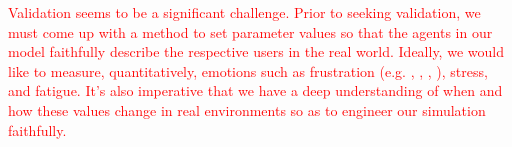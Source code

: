 \documentclass{acm_proc_article-sp}
\begin{document}
 \textcolor{red}{Validation seems to be a significant challenge. Prior to 
 seeking validation, we must come up with a method to 
set parameter values so that the agents in our model faithfully describe 
the respective users in the real world. Ideally, we would like to measure, 
quantitatively, emotions such as frustration (e.g. \cite{hazlett2003measurement}, \cite{kapoor2007automatic}, \cite{klein2002computer}, \cite{reynolds2001sensing}), stress, and fatigue. It's also 
imperative that we have a deep understanding of when and how these values 
change in real environments so as to engineer our simulation faithfully.}



\end{document}
